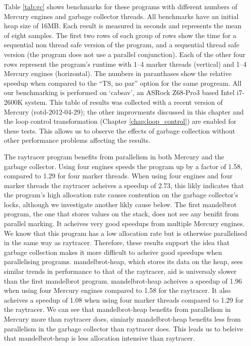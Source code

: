 Table \ref{tab:gc} shows benchmarks for these programs
with different numbers of Mercury engines and garbage collector threads.
All benchmarks have an initial heap size of 16MB.
Each result is measured in seconds and represents the mean of eight samples.
The first two rows of each group of rows show the time for a sequential
non thread safe version of the program,
and a sequential thread safe version
(the program does not use a parallel conjunction).
Each of the other four rows represent the program's runtime with
1--4 marker threads (vertical) and
1--4 Mercury engines (horizontal).
The numbers in paranthases show the relative speedup when compared to the
``TS, no par'' option for the same progream.
All our benchmarking is performed on `cabsav',
an ASRock Z68-Pro3 based Intel i7-2600K system.
This table of results was collected with a recent version of Mercury
(rotd-2012-04-29);
the other improvments discussed in this chapter and the loop control
transformation (Chapter \ref{chap:loop_control})
are enabled for these tests.
This allows us to observe the effects of garbage collection without
other performance problems affecting the results.

The raytracer program benefits from parallelism in both Mercury and the
garbage collector.
Using four engines speeds the program up by a factor of 1.58,
compared to 1.29 for four marker threads.
When using four engines and four marker threads the raytracer
acheives a speedup of 2.73,
this likly indicates that the program's high allocation rate causes
contention on the garbage collector's locks,
although we investigate another likly cause below.
The first mandelbrot program, the one that stores values on the stack,
does not see any benifit from parallel marking.
It acheives very good speedups from multiple Mercury engines.
We know that this program has a low allocation rate
but is otherwise parallelised in the same way as raytracer.
Therefore,
these results support the idea that garbage collection makes it more
difficult to acheive good speedups when parallelising programs.
mandelbrot-heap, which stores its data on the heap,
sees similar trends in performance to that of the raytracer,
aid is universaly slower than the first mandelbrot program.
mandelbrot-heap acheives a speedup of 1.96 when using four Mercury engines
compared to 1.58 for the raytracer.
It also acheives a speedup of 1.08 when using four marker threads compared
to 1.29 for the raytracer.
We can see that mandelbrot-heap benefits from parallelism in Mercury
more than raytracer does,
simiarly mandelbrot-heap benefits less from parallelism in the garbage
collector than raytracer does.
This leads us to beleive that mandelbrot-heap is less allocation intensive
than raytracer.

